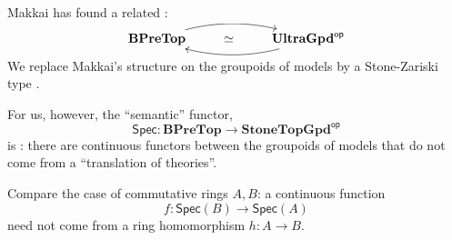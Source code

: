 \documentclass[lambek.tex]{subfiles}
\begin{document}
Makkai has found a related :
\[
\xymatrix{ 
\mathbf{BPreTop}  \ar@/{}^{1pc}/[rr]     & \simeq &  \mathbf{UltraGpd}^{\mathsf{op}}  \ar@/{}^{1pc}/[ll] \\
} 
\]
We replace Makkai's  structure on the groupoids of models by a Stone-Zariski type .
\medskip

For us, however, the ``semantic'' functor,
\[
\mathsf{Spec} : \mathbf{BPreTop} \longrightarrow \mathbf{StoneTopGpd}^{\mathsf{op}}
\]
 is : there are continuous functors between the groupoids of models that do not come from a ``translation of theories''.
\medskip

Compare the case of commutative rings $A, B$:  a continuous function $$f : \mathsf{Spec}(B) \to \mathsf{Spec}(A)$$ need not come from a ring homomorphism $h : A\to B$. 
\end{document}
